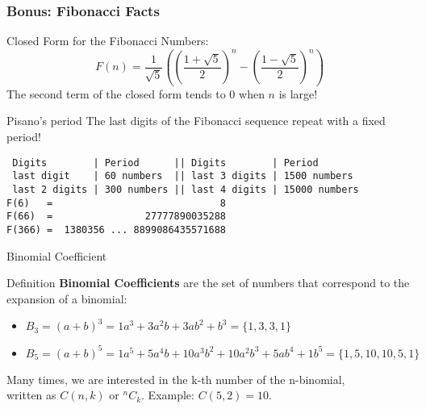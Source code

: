 \begin{frame}[fragile]
  \frametitle{Bonus: Fibonacci Facts}
  \begin{block}{Closed Form for the Fibonacci Numbers:}
    \begin{equation*}
      F(n) = \frac{1}{\sqrt{5}}\left(\left(\frac{1+\sqrt{5}}{2}\right)^n-\left(\frac{1-\sqrt{5}}{2}\right)^n\right)
    \end{equation*}
    The second term of the closed form tends to 0 when $n$ is large!
  \end{block}

  \begin{block}{Pisano's period}
    The last digits of the Fibonacci sequence repeat with a fixed period!\smallskip
{\smaller
\begin{verbatim}
 Digits        | Period      || Digits        | Period
 last digit    | 60 numbers  || last 3 digits | 1500 numbers
 last 2 digits | 300 numbers || last 4 digits | 15000 numbers
F(6)   =                             8
F(66)  =                27777890035288
F(366) =  1380356 ... 8899086435571688
\end{verbatim}}
  \end{block}
\end{frame}


\begin{frame}{Binomial Coefficient}
  \begin{block}{Definition}
    {\bf Binomial Coefficients} are the set of numbers that correspond to the expansion of a binomial:\bigskip

    \begin{itemize}
      \item $B_3 = (a+b)^3 = 1a^3 + 3a^2b + 3ab^2 + b^3 = \{1,3,3,1\}$
      \item $B_5 = (a+b)^5 = 1a^5 + 5a^4b + 10a^3b^2 + 10a^2b^3 + 5ab^4 + 1b^5 = \{1,5,10,10,5,1\}$
    \end{itemize}\bigskip

    Many times, we are interested in the k-th number of the n-binomial,\\ written as $C(n,k)$ or $^nC_k$. Example: $C(5,2) = 10$.
  \end{block}
\end{frame}

